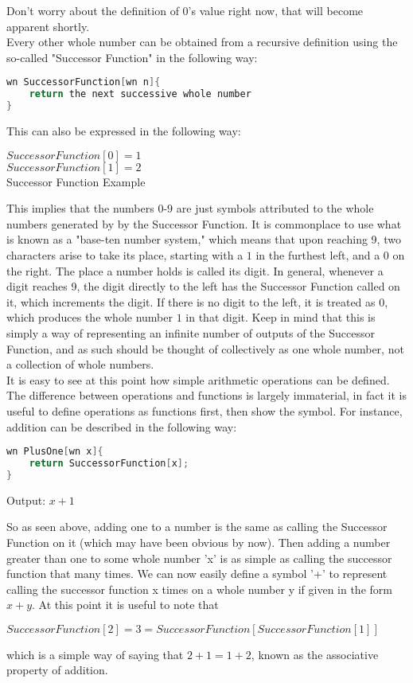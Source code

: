 Don't worry about the definition of $0$'s value right now, that will become apparent shortly. \\
Every other whole number can be obtained from a recursive definition using the so-called "Successor Function" in the following way:
\begin{center}
\begin{lstlisting}[language=C, caption=Successor Function,label=lst:sucFunc]
wn SuccessorFunction[wn n]{
	return the next successive whole number
}
\end{lstlisting}
\end{center} 
This can also be expressed in the following way:
\begin{center}
$SuccessorFunction[0] = 1$\\
$SuccessorFunction[1] = 2$\\
Successor Function Example\label{eq:sucFuncEx}
\end{center}
This implies that the numbers $0$-$9$ are just symbols attributed to the whole numbers generated by by the Successor Function. It is commonplace to use what is known as a "base-ten number system," which means that upon reaching 9, two characters arise to take its place, starting with a $1$ in the furthest left, and a $0$ on the right. The place a number holds is called its digit. In general, whenever a digit reaches 9, the digit directly to the left has the Successor Function called on it, which increments the digit. If there is no digit to the left, it is treated as $0$, which produces the whole number $1$ in that digit. Keep in mind that this is simply a way of representing an infinite number of outputs of the Successor Function, and as such should be thought of collectively as one whole number, not a collection of whole numbers. \\
It is easy to see at this point how simple arithmetic operations can be defined. The difference between operations and functions is largely immaterial, in fact it is useful to define operations as functions first, then show the symbol. For instance, addition can be described in the following way:
\begin{center}
\begin{lstlisting}[language=C,caption=Addition Function,label=lst:addFunc]
wn PlusOne[wn x]{
	return SuccessorFunction[x];
}
\end{lstlisting}
Output: $x+1$
\end{center}
So as seen above, adding one to a number is the same as calling the Successor Function on it (which may have been obvious by now). Then adding a number greater than one to some whole number 'x' is as simple as calling the successor function that many times. We can now easily define a symbol '+' to represent calling the successor function x times on a whole number y if given in the form $x+y$. At this point it is useful to note that
\begin{center}
$SuccessorFunction[2]=3=SuccessorFunction[SuccessorFunction[1]]$
\end{center}
which is a simple way of saying that $2+1=1+2$, known as the associative property of addition.
